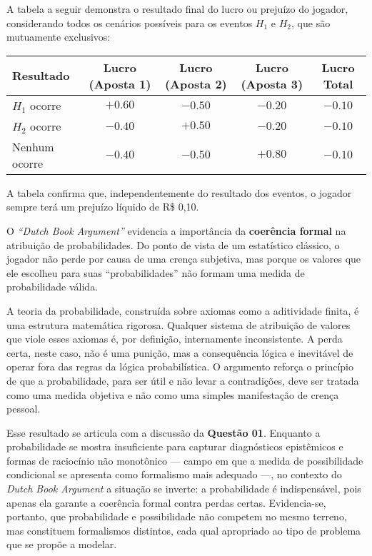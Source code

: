 \documentclass[a4paper]{article}
\begin{document}
    \begin{answer}[Ítem 2.3]
        A tabela a seguir demonstra o resultado final do lucro ou prejuízo do jogador, 
considerando todos os cenários possíveis para os eventos $H_1$ e $H_2$, 
que são mutuamente exclusivos:

\begin{table}[H]
\centering
\begin{tabular}{lcccc}
\toprule
\textbf{Resultado} & \textbf{Lucro (Aposta 1)} & \textbf{Lucro (Aposta 2)} & \textbf{Lucro (Aposta 3)} & \textbf{Lucro Total} \\
\midrule
$H_1$ ocorre      & $+0.60$ & $-0.50$ & $-0.20$ & $-0.10$ \\
$H_2$ ocorre      & $-0.40$ & $+0.50$ & $-0.20$ & $-0.10$ \\
Nenhum ocorre     & $-0.40$ & $-0.50$ & $+0.80$ & $-0.10$ \\
\bottomrule
\end{tabular}
\end{table}

A tabela confirma que, independentemente do resultado dos eventos, 
o jogador sempre terá um prejuízo líquido de R\$ 0,10.
    \end{answer}

    \begin{answer}[Ítem 2.4]
        O \emph{``Dutch Book Argument''} evidencia a importância da 
\textbf{coerência formal} na atribuição de probabilidades. 
Do ponto de vista de um estatístico clássico, o jogador não perde por causa de uma crença subjetiva, 
mas porque os valores que ele escolheu para suas ``probabilidades'' não formam uma medida de probabilidade válida.

A teoria da probabilidade, construída sobre axiomas como a aditividade finita, 
é uma estrutura matemática rigorosa. 
Qualquer sistema de atribuição de valores que viole esses axiomas é, por definição, internamente inconsistente. 
A perda certa, neste caso, não é uma punição, mas a consequência lógica e inevitável de operar fora das regras da lógica probabilística. 
O argumento reforça o princípio de que a probabilidade, para ser útil e não levar a contradições, 
deve ser tratada como uma medida objetiva e não como uma simples manifestação de crença pessoal.

Esse resultado se articula com a discussão da \textbf{Questão 01}. 
Enquanto a probabilidade se mostra insuficiente para capturar diagnósticos epistêmicos e formas de raciocínio não monotônico --- 
campo em que a medida de possibilidade condicional se apresenta como formalismo mais adequado ---, 
no contexto do \emph{Dutch Book Argument} a situação se inverte: 
a probabilidade é indispensável, pois apenas ela garante a coerência formal contra perdas certas. 
Evidencia-se, portanto, que probabilidade e possibilidade não competem no mesmo terreno, 
mas constituem formalismos distintos, cada qual apropriado ao tipo de problema que se propõe a modelar.

    \end{answer}
\end{document}
